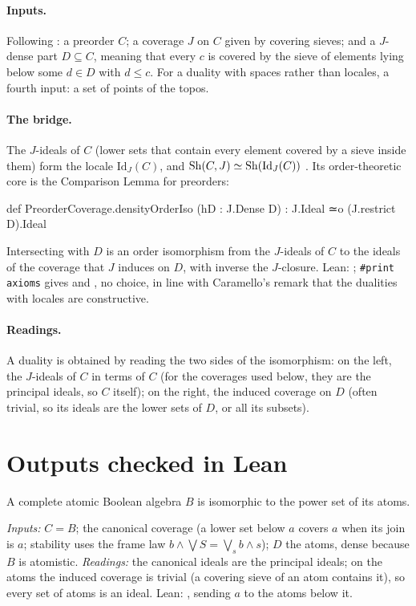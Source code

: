 \documentclass[11pt]{article}
\newcommand{\Id}{\mathrm{Id}}
\begin{document}
\paragraph{Inputs.} Following \cite[\S3, \S9]{caramello-stone}: a preorder $C$; a coverage $J$ on
$C$ given by covering sieves; and a $J$-dense part $D\subseteq C$, meaning that every $c$ is covered
by the sieve of elements lying below some $d\in D$ with $d\le c$. For a duality with spaces rather
than locales, a fourth input: a set of points of the topos.

\paragraph{The bridge.} The $J$-ideals of $C$ (lower sets that contain every element covered by a
sieve inside them) form the locale $\Id_J(C)$, and $\Sh(C,J)\simeq\Sh(\Id_J(C))$
\cite[Thm.~3.1]{caramello-stone}. Its order-theoretic core is the Comparison Lemma for preorders:

\begin{leancode}
def PreorderCoverage.densityOrderIso (hD : J.Dense D) :
    J.Ideal ≃o (J.restrict D).Ideal
\end{leancode}
Intersecting with $D$ is an order isomorphism from the $J$-ideals of $C$ to the ideals of the
coverage that $J$ induces on $D$, with inverse the $J$-closure. Lean: ;
\verb|#print axioms| gives  and , no choice, in line with
Caramello's remark that the dualities with locales are constructive.

\paragraph{Readings.} A duality is obtained by reading the two sides of the isomorphism: on the
left, the $J$-ideals of $C$ in terms of $C$ (for the coverages used below, they are the principal
ideals, so $C$ itself); on the right, the induced coverage on $D$ (often trivial, so its ideals
are the lower sets of $D$, or all its subsets).

\section{Outputs checked in Lean}\label{sec:outputs}

\begin{bridge}
A complete atomic Boolean algebra $B$ is isomorphic to the power set of its atoms.
\end{bridge}
\emph{Inputs:} $C=B$; the canonical coverage (a lower set below $a$ covers $a$ when its join is
$a$; stability uses the frame law $b\wedge\bigvee S=\bigvee_{s}b\wedge s$); $D$ the atoms, dense
because $B$ is atomistic. \emph{Readings:} the canonical ideals are the principal ideals; on the
atoms the induced coverage is trivial (a covering sieve of an atom contains it), so every set of
atoms is an ideal. Lean: , sending $a$ to the
atoms below it.
\end{document}
